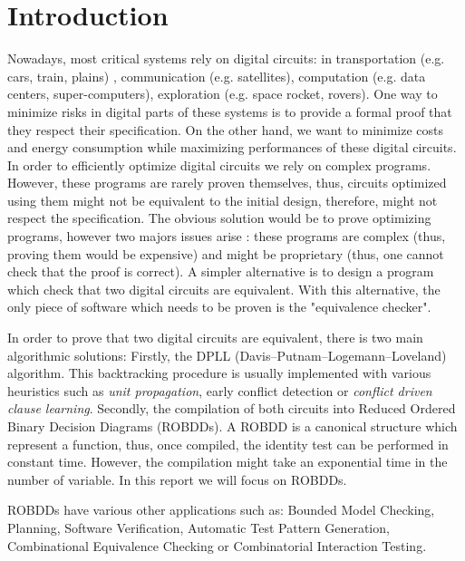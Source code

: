 \documentclass[a4paper,10pt]{article}
\begin{document}
\section{Introduction}

Nowadays, most critical systems rely on digital circuits: in transportation (e.g. cars, train, plains) , communication (e.g. satellites), computation (e.g. data centers, super-computers), exploration (e.g. space rocket, rovers).
One way to minimize risks in digital parts of these systems is to provide a formal proof that they respect their specification.
On the other hand, we want to minimize costs and energy consumption while maximizing performances of these digital circuits.
In order to efficiently optimize digital circuits we rely on complex programs.
However, these programs are rarely proven themselves, thus, circuits optimized using them might not be equivalent to the initial design, therefore, might not respect the specification.
The obvious solution would be to prove optimizing programs, however two majors issues arise : these programs are complex  (thus, proving them would be expensive) and might be proprietary (thus, one cannot check that the proof is correct).
A simpler alternative is to design a program which check that two digital circuits are equivalent.
With this alternative, the only piece of software which needs to be proven is the "equivalence checker".


In order to prove that two digital circuits are equivalent, there is two main algorithmic solutions:
Firstly, the DPLL (Davis–Putnam–Logemann–Loveland) algorithm.
This backtracking procedure is usually implemented with various heuristics such as \textit{unit propagation}, early conflict detection or \textit{conflict driven clause learning}.
Secondly, the compilation of both circuits into Reduced Ordered Binary Decision Diagrams (ROBDDs).
A ROBDD is a canonical structure which represent a function, thus, once compiled, the identity test can be performed in constant time.
However, the compilation might take an exponential time in the number of variable.
In this report we will focus on ROBDDs.


ROBDDs have various other applications such as: Bounded Model Checking, Planning, Software Verification, Automatic Test Pattern Generation, Combinational Equivalence Checking or Combinatorial Interaction Testing.

\end{document}
